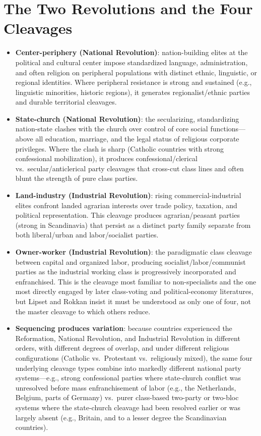 \documentclass[12pt]{article}
\begin{document}
\section{The Two Revolutions and the Four Cleavages}

\begin{itemize}[leftmargin=*, itemsep=4pt]
    \item \textbf{Center-periphery (National Revolution)}: nation-building elites at the political and cultural center impose standardized language, administration, and often religion on peripheral populations with distinct ethnic, linguistic, or regional identities. Where peripheral resistance is strong and sustained (e.g., linguistic minorities, historic regions), it generates regionalist/ethnic parties and durable territorial cleavages.
    \item \textbf{State-church (National Revolution)}: the secularizing, standardizing nation-state clashes with the church over control of core social functions---above all education, marriage, and the legal status of religious corporate privileges. Where the clash is sharp (Catholic countries with strong confessional mobilization), it produces confessional/clerical vs.\ secular/anticlerical party cleavages that cross-cut class lines and often blunt the strength of pure class parties.
    \item \textbf{Land-industry (Industrial Revolution)}: rising commercial-industrial elites confront landed agrarian interests over trade policy, taxation, and political representation. This cleavage produces agrarian/peasant parties (strong in Scandinavia) that persist as a distinct party family separate from both liberal/urban and labor/socialist parties.
    \item \textbf{Owner-worker (Industrial Revolution)}: the paradigmatic class cleavage between capital and organized labor, producing socialist/labor/communist parties as the industrial working class is progressively incorporated and enfranchised. This is the cleavage most familiar to non-specialists and the one most directly engaged by later class-voting and political-economy literatures, but Lipset and Rokkan insist it must be understood as only one of four, not the master cleavage to which others reduce.
    \item \textbf{Sequencing produces variation}: because countries experienced the Reformation, National Revolution, and Industrial Revolution in different orders, with different degrees of overlap, and under different religious configurations (Catholic vs.\ Protestant vs.\ religiously mixed), the same four underlying cleavage types combine into markedly different national party systems---e.g., strong confessional parties where state-church conflict was unresolved before mass enfranchisement of labor (e.g., the Netherlands, Belgium, parts of Germany) vs.\ purer class-based two-party or two-bloc systems where the state-church cleavage had been resolved earlier or was largely absent (e.g., Britain, and to a lesser degree the Scandinavian countries).
\end{itemize}
\end{document}
